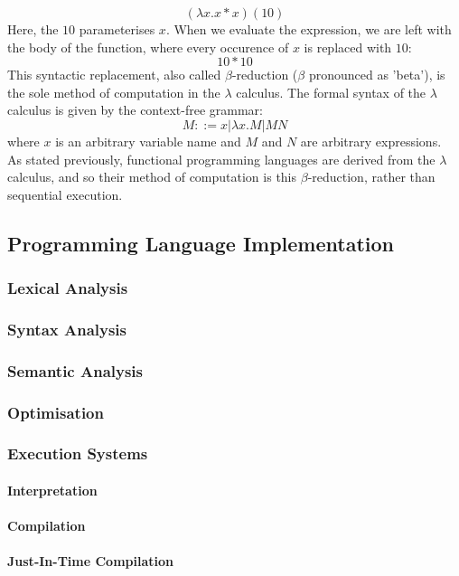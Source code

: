 \documentclass{article}
\begin{document}
\[ (\lambda x.x * x)(10) \]
Here, the $10$ parameterises $x$. When we evaluate the expression, we are left with the body of the function, where every occurence of $x$ is replaced with $10$:
\[ 10 * 10 \]
This syntactic replacement, also called $\beta$-reduction ($\beta$ pronounced as 'beta'), is the sole method of computation in the $\lambda$ calculus. The formal syntax of the $\lambda$ calculus is given by the context-free grammar:
\[ M ::= x | \lambda x.M | MN \]
where $x$ is an arbitrary variable name and $M$ and $N$ are arbitrary expressions.
\\
\indent As stated previously, functional programming languages are derived from the $\lambda$ calculus, and so their method of computation is this $\beta$-reduction, rather than sequential execution.

\subsection{Programming Language Implementation}
\subsubsection{Lexical Analysis}
\subsubsection{Syntax Analysis}
\subsubsection{Semantic Analysis}
\subsubsection{Optimisation}
\subsubsection{Execution Systems}
\paragraph{Interpretation \\}
\paragraph{Compilation \\}
\paragraph{Just-In-Time Compilation \\}
\end{document}

